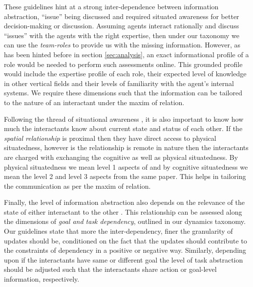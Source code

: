\documentclass[letterpaper, 10 pt, conference]{ieeeconf}  %
\theoremstyle{definition}
\begin{document}
\begin{enumerate}
    These guidelines hint at a strong inter-dependence between information abstraction, ``issue'' being discussed and required situated awareness for better decision-making or discussion.
    Assuming agents interact rationally and discuss ``issues'' with the agents with the right expertise, then under our taxonomy we can use the \textit{team-roles} to provide us with the missing information.
    However, as has been hinted before in section \ref{sec:analysis}, an exact informational profile of a role would be needed to perform such assessments online.
    This grounded profile would include the expertise profile of each role, their expected level of knowledge in other vertical fields and their levels of familiarity with the agent's internal systems.
    We require these dimensions such that the information can be tailored to the nature of an interactant under the maxim of relation.
    
    Following the thread of situational awareness \cite{endsley1988design}, it is also important to know how much the interactants know about current state and status of each other.
    If the \textit{spatial relationship} is proximal then they have direct access to physical situatedness, however is the relationship is remote in nature then the interactants are charged with exchanging the cognitive as well as physical situatedness.
    By physical situatedness we mean level 1 aspects of \cite{chen2018situation} and by cognitive situatedness we mean the level 2 and level 3 aspects from the same paper.
    This helps in tailoring the communication as per the maxim of relation.
    
    Finally, the level of information abstraction also depends on the relevance of the state of either interactant to the other \cite{JiangArkin2015, Beer2014toward}.
    This relationship can be assessed along the dimensions of \textit{goal and task dependency}, outlined in our dynamics taxonomy.
    Our guidelines state that more the inter-dependency, finer the granularity of updates should be, conditioned on the fact that the updates should contribute to the constraints of dependency in a positive or negative way.
    Similarly, depending upon if the interactants have same or different goal the level of task abstraction should be adjusted such that the interactants share action or goal-level information, respectively.
    
\end{enumerate}
\end{document}
